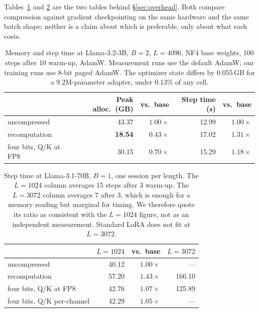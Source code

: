 \documentclass[11pt,letterpaper]{article}
\begin{document}
\medskip
Tables~\ref{tab:gc} and \ref{tab:70b_time} are the two tables behind \S\ref{sec:overhead}. Both compare compression against gradient checkpointing on the same hardware and the same batch shape; neither is a claim about which is preferable, only about what each costs.

\begin{table}[t]
\centering
\small
\caption{Memory and step time at Llama-3.2-3B, $B{=}2$, $L{=}4096$, NF4 base weights, 100 steps after 10 warm-up, AdamW. Measurement runs use the default AdamW; our training runs use 8-bit paged AdamW. The optimizer state differs by 0.055\,GB for a $9.2$M-parameter adapter, under 0.13\% of any cell.}
\label{tab:gc}
\begin{tabular}{lrrrr}
\toprule
& Peak alloc.\ (GB) & vs.\ base & Step time (s) & vs.\ base \\
\midrule
uncompressed          & 43.37 & $1.00\times$ & 12.99 & $1.00\times$ \\
recomputation         & \textbf{18.54} & $\mathbf{0.43\times}$ & 17.02 & $1.31\times$ \\
four bits, Q/K at FP8 & 30.15 & $0.70\times$ & 15.29 & $\mathbf{1.18\times}$ \\
\bottomrule
\end{tabular}
\end{table}

\begin{table}[htbp]
\centering
\small
\caption{Step time at Llama-3.1-70B, $B{=}1$, one session per length. The $L{=}1024$ column averages 15 steps after 3 warm-up. The $L{=}3072$ column averages 7 after 3, which is enough for a memory reading but marginal for timing. We therefore quote its ratio as consistent with the $L{=}1024$ figure, not as an independent measurement. Standard LoRA does not fit at $L{=}3072$.}
\label{tab:70b_time}
\begin{tabular}{lrrr}
\toprule
& $L{=}1024$ & vs.\ base & $L{=}3072$ \\
\midrule
uncompressed          & 40.12 & $1.00\times$ & --- \\
recomputation         & 57.20 & $1.43\times$ & 166.10 \\
four bits, Q/K at FP8 & 42.76 & $1.07\times$ & 125.89 \\
four bits, Q/K per-channel & 42.29 & $1.05\times$ & --- \\
\bottomrule
\end{tabular}
\end{table}
\end{document}
